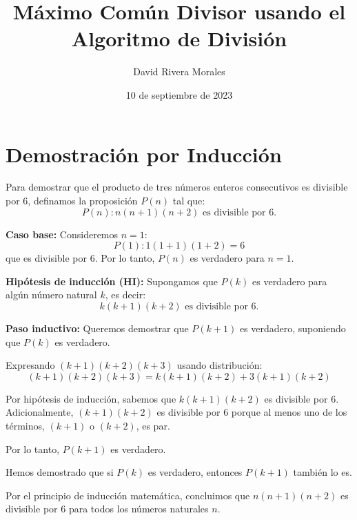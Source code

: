 \documentclass{article}
\author{David Rivera Morales}
\title{Máximo Común Divisor usando el Algoritmo de División}
\date{10 de septiembre de 2023}
\begin{document}
\maketitle

\section*{Demostración por Inducción}

Para demostrar que el producto de tres números enteros consecutivos es divisible por 6, definamos la proposición \( P(n) \) tal que:
\[ P(n): n(n + 1)(n + 2) \text{ es divisible por 6.} \]

\textbf{Caso base:} Consideremos \( n = 1 \):
\[ P(1): 1(1 + 1)(1 + 2) = 6 \]
que es divisible por 6. Por lo tanto, \( P(n) \) es verdadero para \( n = 1 \).

\textbf{Hipótesis de inducción (HI):} Supongamos que \( P(k) \) es verdadero para algún número natural \( k \), es decir:
\[ k(k + 1)(k + 2) \text{ es divisible por 6.} \]

\textbf{Paso inductivo:} Queremos demostrar que \( P(k + 1) \) es verdadero, suponiendo que \( P(k) \) es verdadero.

Expresando \( (k+1)(k+2)(k+3) \) usando distribución:
\[ (k+1)(k+2)(k+3) = k(k+1)(k+2) + 3(k+1)(k+2) \]

Por hipótesis de inducción, sabemos que \( k(k+1)(k+2) \) es divisible por 6. Adicionalmente, \( (k+1)(k+2) \) es divisible por 6 porque al menos uno de los términos, \( (k+1) \) o \( (k+2) \), es par.

Por lo tanto, \( P(k + 1) \) es verdadero.

Hemos demostrado que si \( P(k) \) es verdadero, entonces \( P(k+1) \) también lo es.

Por el principio de inducción matemática, concluimos que \( n(n+1)(n+2) \) es divisible por 6 para todos los números naturales \( n \).
\end{document}
